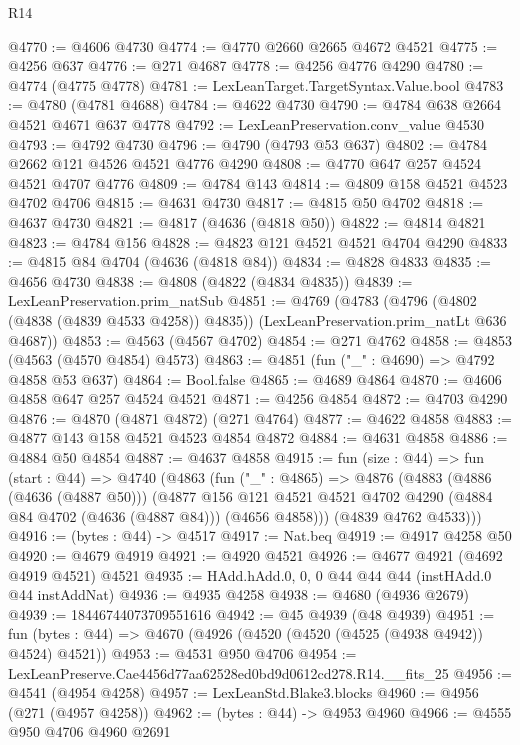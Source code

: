 \begin{lexlean}{R14}
\begin{coremodule}
@4770 := @4606 @4730
@4774 := @4770 @2660 @2665 @4672 @4521
@4775 := @4256 @637
@4776 := @271 @4687
@4778 := @4256 @4776 @4290
@4780 := @4774 (@4775 @4778)
@4781 := LexLeanTarget.TargetSyntax.Value.bool
@4783 := @4780 (@4781 @4688)
@4784 := @4622 @4730
@4790 := @4784 @638 @2664 @4521 @4671 @637 @4778
@4792 := LexLeanPreservation.conv_value @4530
@4793 := @4792 @4730
@4796 := @4790 (@4793 @53 @637)
@4802 := @4784 @2662 @121 @4526 @4521 @4776 @4290
@4808 := @4770 @647 @257 @4524 @4521 @4707 @4776
@4809 := @4784 @143
@4814 := @4809 @158 @4521 @4523 @4702 @4706
@4815 := @4631 @4730
@4817 := @4815 @50 @4702
@4818 := @4637 @4730
@4821 := @4817 (@4636 (@4818 @50))
@4822 := @4814 @4821
@4823 := @4784 @156
@4828 := @4823 @121 @4521 @4521 @4704 @4290
@4833 := @4815 @84 @4704 (@4636 (@4818 @84))
@4834 := @4828 @4833
@4835 := @4656 @4730
@4838 := @4808 (@4822 (@4834 @4835))
@4839 := LexLeanPreservation.prim_natSub
@4851 := @4769
    (@4783
      (@4796 (@4802 (@4838 (@4839 @4533 @4258)) @4835))
      (LexLeanPreservation.prim_natLt @636 @4687))
@4853 := @4563 (@4567 @4702)
@4854 := @271 @4762
@4858 := @4853 (@4563 (@4570 @4854) @4573)
@4863 := @4851 (fun ("_" : @4690) => @4792 @4858 @53 @637)
@4864 := Bool.false
@4865 := @4689 @4864
@4870 := @4606 @4858 @647 @257 @4524 @4521
@4871 := @4256 @4854
@4872 := @4703 @4290
@4876 := @4870 (@4871 @4872) (@271 @4764)
@4877 := @4622 @4858
@4883 := @4877 @143 @158 @4521 @4523 @4854 @4872
@4884 := @4631 @4858
@4886 := @4884 @50 @4854
@4887 := @4637 @4858
@4915 := fun (size : @44) =>
  fun (start : @44) =>
  @4740
    (@4863
      (fun ("_" : @4865) =>
      @4876
        (@4883
          (@4886 (@4636 (@4887 @50)))
          (@4877
            @156
            @121
            @4521
            @4521
            @4702
            @4290
            (@4884 @84 @4702 (@4636 (@4887 @84)))
            (@4656 @4858)))
        (@4839 @4762 @4533)))
@4916 := (bytes : @44) -> @4517
@4917 := Nat.beq
@4919 := @4917 @4258 @50
@4920 := @4679 @4919
@4921 := @4920 @4521
@4926 := @4677 @4921 (@4692 @4919 @4521) @4521
@4935 := HAdd.hAdd.{0, 0, 0} @44 @44 @44 (instHAdd.{0} @44 instAddNat)
@4936 := @4935 @4258
@4938 := @4680 (@4936 @2679)
@4939 := 18446744073709551616
@4942 := @45 @4939 (@48 @4939)
@4951 := fun (bytes : @44) => @4670 (@4926 (@4520 (@4520 (@4525 (@4938 @4942)) @4524) @4521))
@4953 := @4531 @950 @4706
@4954 := LexLeanPreserve.Cae4456d77aa62528ed0bd9d0612cd278.R14.__fits_25
@4956 := @4541 (@4954 @4258)
@4957 := LexLeanStd.Blake3.blocks
@4960 := @4956 (@271 (@4957 @4258))
@4962 := (bytes : @44) -> @4953 @4960
@4966 := @4555 @950 @4706 @4960 @2691

\end{coremodule}
\end{lexlean}
